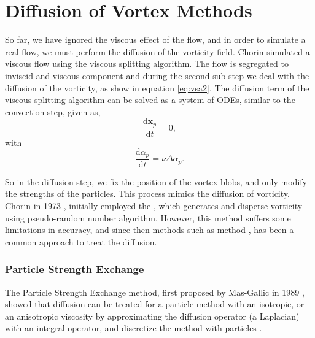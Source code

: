 %
%
%	

\section{Diffusion of Vortex Methods}
\label{sec:diffusionVM}

So far, we have ignored the viscous effect of the flow, and in order to simulate a real flow, we must perform the diffusion of the vorticity field. Chorin simulated a viscous flow using the viscous splitting algorithm. The flow is segregated to inviscid and viscous component and during the second sub-step we deal with the diffusion of the vorticity, as show in equation \ref{eq:vsa2}. The diffusion term of the viscous splitting algorithm can be solved as a system of ODEs, similar to the convection step, given as,
	\begin{equation}
	\frac{\mathrm{d}\mathbf{x}_p}{\mathrm{d}t} = 0,
	\end{equation}
with
	\begin{equation}
	\frac{\mathrm{d}\alpha_p}{\mathrm{d}t} = \nu\Delta\alpha_p.
	\end{equation}

So in the diffusion step, we fix the position of the vortex blobs, and only modify the strengths of the particles. This process mimics the diffusion of vorticity. Chorin in 1973 \cite{Chorin1973a}, initially employed the , which generates and disperse vorticity using pseudo-random number algorithm. However, this method suffers some limitations in accuracy, and since then methods such as  method \cite{Degond1989a}, has been a common approach to treat the diffusion.

\subsubsection*{Particle Strength Exchange}
The Particle Strength Exchange method, first proposed by Mas-Gallic in 1989 \cite{Degond1989a}, showed that diffusion can be treated for a particle method with an isotropic, or an anisotropic viscosity by approximating the diffusion operator (a Laplacian) with an integral operator, and discretize the method with particles \cite{Speck2011a}. %
 
